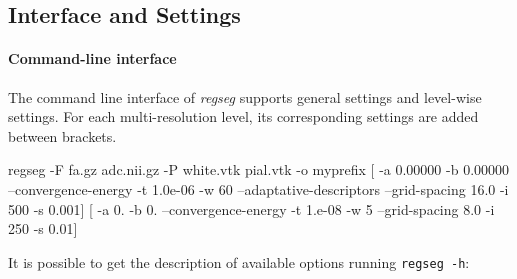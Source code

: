 \documentclass[a4paper]{report}
\newcommand*{\codeinline}[1]{\colorbox{listingbg}{\lstinline!#1!}}
\begin{document}
\subsection{Interface and Settings}\label{sec:interface_settings}

\paragraph{Command-line interface}
The command line interface of \emph{regseg} supports general settings and level-wise settings.
For each multi-resolution level, its corresponding settings are added between brackets.

\begin{bashcode}
regseg -F fa.gz adc.nii.gz -P white.vtk pial.vtk -o myprefix [ -a 0.00000 -b 0.00000 --convergence-energy -t 1.0e-06 -w 60 --adaptative-descriptors --grid-spacing 16.0 -i 500 -s 0.001] [ -a 0. -b 0. --convergence-energy -t 1.e-08 -w 5 --grid-spacing 8.0 -i 250 -s 0.01]
\end{bashcode}


It is possible to get the description of available options running
  \codeinline{regseg -h}:
\end{document}
